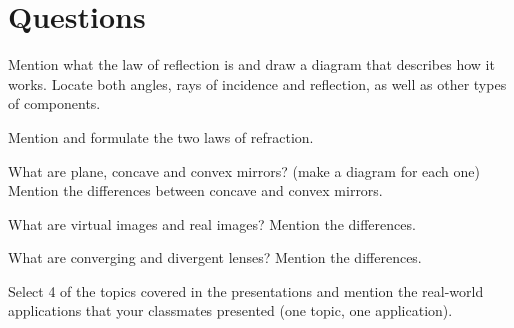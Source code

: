 \section{\large Questions}

\begin{question}
    Mention what the law of reflection is and draw a diagram that describes how it works.
    Locate both angles, rays of incidence and reflection, as well as other types of components.
\end{question}

\begin{question}
    Mention and formulate the two laws of refraction.
\end{question}

\begin{question}
    What are plane, concave and convex mirrors? (make a diagram for each one)
    Mention the differences between concave and convex mirrors.
\end{question}

\begin{question}
    What are virtual images and real images?
    Mention the differences.
\end{question}

\begin{question}
    What are converging and divergent lenses?
    Mention the differences.
\end{question}

\begin{question}
    Select 4 of the topics covered in the presentations and mention the real-world applications that your classmates presented (one topic, one application).
\end{question}